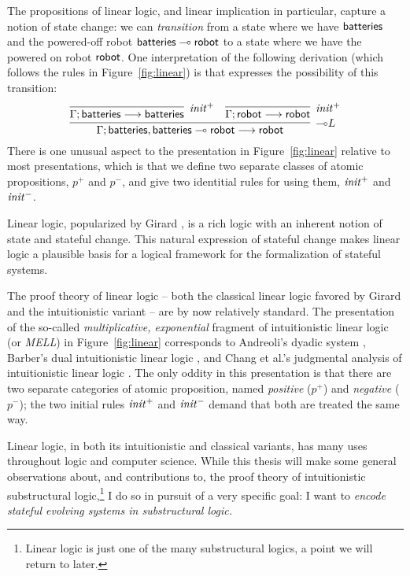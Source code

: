 The propositions of linear logic, and linear implication in
particular, capture a notion of state change: we can {\it transition}
from a state where we have ${\sf batteries}$ and the powered-off robot
${\sf batteries} \multimap {\sf robot}$ to a state where we have the
powered on robot ${\sf robot}$. One interpretation of the following derivation
(which follows the rules in Figure~\ref{fig:linear})
is that expresses the possibility of this transition:
\[
\infer[{\lolli}L]
{\seq{\Gamma}{{\sf batteries}, {\sf batteries} \lolli {\sf robot}}{{\sf robot}}}
{\infer[{\it init}^+]
 {\seq{\Gamma}{{\sf batteries}}{{\sf batteries}}}
 {}
 &
 \infer[{\it init}^+]
 {\seq{\Gamma}{{\sf robot}}{{\sf robot}}}
 {}}
\] 
There is one unusual aspect to the presentation in Figure~\ref{fig:linear}
relative to most presentations, which is that we define two separate classes
of atomic propositions, $p^+$ and $p^-$, and give two identitial rules
for using them, ${\it init}^+$ and ${\it init}^-$.

Linear logic, popularized by Girard \cite{girard87linear}, is a rich
logic with an inherent notion of state and stateful change. This
natural expression of stateful change makes linear logic a plausible
basis for a logical framework for the formalization of stateful
systems.


The proof theory of linear logic -- both the classical linear logic
favored by Girard and the intuitionistic variant -- are by now
relatively standard. The presentation of the so-called {\it
  multiplicative, exponential} fragment of intuitionistic linear logic
(or {\it MELL}) in Figure~\ref{fig:linear} corresponds to Andreoli's
dyadic system \cite{andreoli92logic}, Barber's dual intuitionistic
linear logic \cite{barber96dual}, and Chang et al.'s judgmental
analysis of intuitionistic linear logic \cite{chang03judgmental}.  The
only oddity in this presentation is that there are two separate
categories of atomic proposition, named {\it positive} ($p^+$) and
{\it negative} ($p^-$); the two initial rules ${\it init}^+$ and ${\it
  init}^-$ demand that both are treated the same way.

Linear logic, in both its intuitionistic and classical variants, has
many uses throughout logic and computer science. While this thesis
will make some general observations about, and contributions to, the
proof theory of intuitionistic substructural logic,\footnote{Linear logic is
just one of the many substructural logics, a point we will return to
later.} I do so in pursuit of a very specific goal: I want to {\it encode
stateful evolving systems in substructural logic.}

